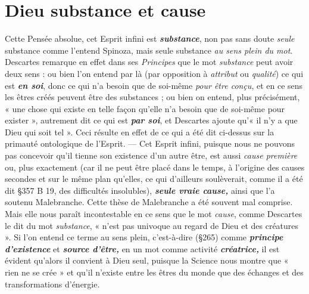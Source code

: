 \section{Dieu substance et cause}%
Cette Pensée absolue, cet
Esprit infini est \textbf{\textit {substance}}, non pas sans doute {\it seule} substance comme
l'entend Spinoza, mais seule substance {\it au sens plein du mot}. Descartes
remarque en effet dans ses {\it Principes} que le mot {\it substance} peut
avoir deux sens : ou bien l’on entend par là (par opposition à {\it attribut}
ou {\it qualité}) ce qui est \textbf{\textit {en soi}}, donc ce qui n’a besoin que de soi-même
{\it pour être conçu}, et en ce sens les êtres créés peuvent être
des substances ; ou bien on entend, plus précisément, « une chose
qui existe en telle façon qu’elle n’a besoin que de soi-même pour
exister », autrement dit ce qui est \textbf{\textit {par soi}}, et Descartes ajoute qu’« il
n’y a que Dieu qui soit tel ». Ceci résulte en effet de ce qui a été dit
ci-dessus sur la primauté ontologique de l'Esprit. — Cet Esprit infini,
puisque nous ne pouvons pas concevoir qu’il tienne son existence
d’un autre être, est aussi {\it cause première} ou, plus exactement (car il
ne peut être placé dans le temps, à l’origine des causes secondes et
sur le même plan qu’elles, ce qui d’ailleurs soulèverait, comme il a
été dit \S 357 B 19, des difficultés insolubles), \textbf{\textit {seule vraie cause,}} ainsi
que l’a soutenu Malebranche. Cette thèse de Malebranche a été
souvent mal comprise. Mais elle nous paraît incontestable en ce sens
que le mot {\it cause}, comme Descartes le dit du mot {\it substance}, « n’est
pas univoque au regard de Dieu et des créatures ». Si l’on entend ce
terme au sens plein, c’est-à-dire (\S 265) comme \textbf{\textit {principe d'existence}} et
\textbf{\textit {source d’être,}} en un mot comme activité \textbf{\textit {créatrice,}} il est évident
qu’alors il convient à Dieu seul, puisque la Science nous montre que
« rien ne se crée » et qu’il n’existe entre les êtres du monde que des
échanges et des transformations d'énergie.

